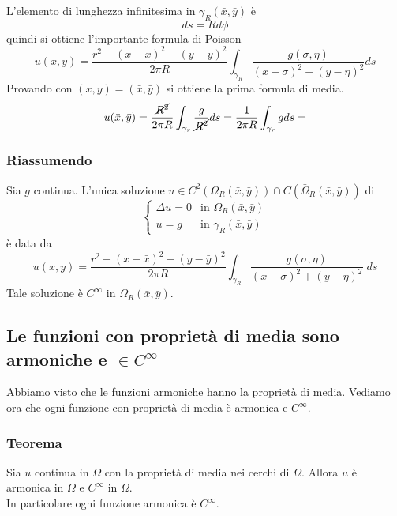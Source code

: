 L'elemento di lunghezza infinitesima in $\gamma_R (\bar{x}, \bar{y})$ \`e
\[
	ds= Rd\phi
\]
quindi si ottiene l'importante formula di Poisson
\[
	u(x,y)= \frac{r^2 - (x - \bar{x})^2 - (y -\bar{y})^2}{2 \pi R}
	\int_{\gamma_R} \frac{g(\sigma, \eta)}{(x - \sigma)^2+(y - \eta)^2} ds
\]
Provando con $(x,y)=(\bar{x},\bar{y})$ si ottiene la prima formula di media.
\[
	u (\bar{x},\bar{y}) = \frac{\cancel{R^2}}{2\pi R}
	\int_{\gamma_r} \frac{g}{\cancel{R^2}} ds=
	\frac{1}{2\pi R}
	\int_{\gamma_r} g ds=
\]
\subsubsection{Riassumendo}
Sia $g$ continua. L'unica soluzione
$u \in C^2 (\Omega_R (\bar{x}, \bar{y})) \cap C( \bar{ \Omega}_R (\bar{x},
\bar{y}))$ di
\[
	\left\{
	\begin{array}{ll}
		\Delta u=0 	& \text{in } \Omega_R(\bar{x}, \bar{y}) \\
		u=g 		& \text{in } \gamma_R(\bar{x}, \bar{y})
	\end{array}
	\right.
\]
\`e data da
\[
	u(x,y)= \frac{r^2 - (x - \bar{x})^2 - (y -\bar{y})^2}{2 \pi R}
	\int_{\gamma_R} \frac{g(\sigma, \eta)}{(x - \sigma)^2+(y - \eta)^2} \;
ds
\]
Tale soluzione \`e $C^{\infty}$ in $\Omega_R(\bar{x}, \bar{y})$.

\subsection{\texorpdfstring
{Le funzioni con propriet\`a di media sono armoniche e $\in C^{\infty}$}
{Le funzioni con propriet\`a di media sono armoniche e C inf}}
Abbiamo visto che le funzioni armoniche hanno la propriet\`a di media.
Vediamo ora che ogni funzione con propriet\`a di media \`e armonica e
$C^{\infty}$.
\subsubsection{Teorema}
Sia $u$ continua in $\Omega$ con la propriet\`a di media nei cerchi di
$\Omega$. Allora $u$ \`e armonica in $\Omega$ e $C^{\infty}$ in $\Omega$.\\
In particolare ogni funzione armonica \`e $C^{\infty}$.
